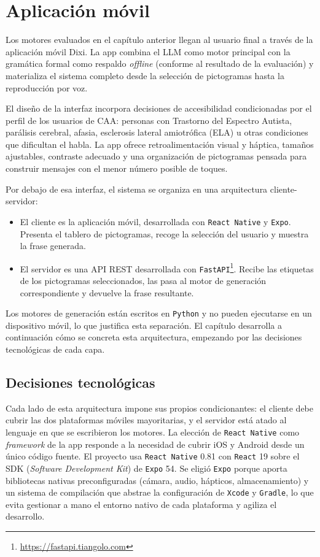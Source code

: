 \chapter{Aplicación móvil}
\label{ch:aplicacion-movil}

Los motores evaluados en el capítulo anterior llegan al usuario final a través de la aplicación móvil Dixi. La app combina el LLM como motor principal con la gramática formal como respaldo \textit{offline} (conforme al resultado de la evaluación) y materializa el sistema completo desde la selección de pictogramas hasta la reproducción por voz.

El diseño de la interfaz incorpora decisiones de accesibilidad condicionadas por el perfil de los usuarios de CAA: personas con Trastorno del Espectro Autista, parálisis cerebral, afasia, esclerosis lateral amiotrófica (ELA) u otras condiciones que dificultan el habla. La app ofrece retroalimentación visual y háptica, tamaños ajustables, contraste adecuado y una organización de pictogramas pensada para construir mensajes con el menor número posible de toques.

Por debajo de esa interfaz, el sistema se organiza en una arquitectura cliente-servidor:

\begin{itemize}
    \item El cliente es la aplicación móvil, desarrollada con \texttt{React Native} y \texttt{Expo}. Presenta el tablero de pictogramas, recoge la selección del usuario y muestra la frase generada.
    \item El servidor es una API REST desarrollada con \texttt{FastAPI}\footnote{\url{https://fastapi.tiangolo.com}}. Recibe las etiquetas de los pictogramas seleccionados, las pasa al motor de generación correspondiente y devuelve la frase resultante.
\end{itemize}

Los motores de generación están escritos en \texttt{Python} y no pueden ejecutarse en un dispositivo móvil, lo que justifica esta separación. El capítulo desarrolla a continuación cómo se concreta esta arquitectura, empezando por las decisiones tecnológicas de cada capa.

\section{Decisiones tecnológicas}
\label{sec:app-tecnologias}

Cada lado de esta arquitectura impone sus propios condicionantes: el cliente debe cubrir las dos plataformas móviles mayoritarias, y el servidor está atado al lenguaje en que se escribieron los motores. La elección de \texttt{React Native} como \textit{framework} de la app responde a la necesidad de cubrir iOS y Android desde un único código fuente. El proyecto usa \texttt{React Native} 0.81 con \texttt{React} 19 sobre el SDK (\textit{Software Development Kit}) de \texttt{Expo} 54. Se eligió \texttt{Expo} porque aporta bibliotecas nativas preconfiguradas (cámara, audio, hápticos, almacenamiento) y un sistema de compilación que abstrae la configuración de \texttt{Xcode} y \texttt{Gradle}, lo que evita gestionar a mano el entorno nativo de cada plataforma y agiliza el desarrollo.

